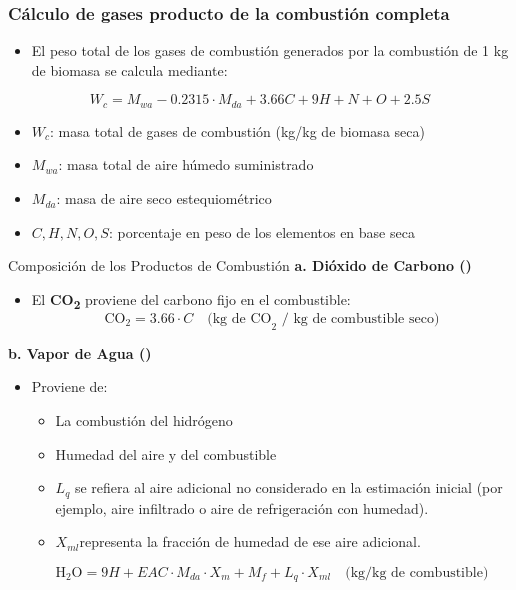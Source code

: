 \documentclass[../../main.tex]{subfiles}
\begin{document}
\begin{frame}
\frametitle{Cálculo de gases producto de la combustión completa}

\begin{itemize}
    \item El peso total de los gases de combustión generados por la combustión de 1 kg de biomasa se calcula mediante:
\end{itemize}

\[
W_c = M_{wa} - 0.2315 \cdot M_{da} + 3.66C + 9H + N + O + 2.5S \tag{3.33}
\]

\begin{itemize}
    \item $W_c$: masa total de gases de combustión (kg/kg de biomasa seca)
    \item $M_{wa}$: masa total de aire húmedo suministrado
    \item $M_{da}$: masa de aire seco estequiométrico
    \item $C, H, N, O, S$: porcentaje en peso de los elementos en base seca
\end{itemize}

\end{frame}



\begin{frame}{Composición de los Productos de Combustión}
\textbf{a. Dióxido de Carbono ()}

\begin{itemize}
    \item El \textbf{CO\textsubscript{2}} proviene del carbono fijo en el combustible:
    \[
    \text{CO}_2 = 3.66 \cdot C \quad \text{(kg de CO}_2\text{ / kg de combustible seco)}
    \]
\end{itemize}

\textbf{b. Vapor de Agua ()}

\begin{itemize}
    \item Proviene de:
    \begin{itemize}
        \item La combustión del hidrógeno
        \item Humedad del aire y del combustible
        \item \(L_q\) se refiera al aire adicional no considerado en la estimación inicial (por ejemplo, aire infiltrado o aire de refrigeración con humedad).
        \item \(X_{ml}\)representa la fracción de humedad de ese aire adicional.
    \end{itemize}
    \[
    \text{H}_2\text{O} = 9H + EAC \cdot M_{da} \cdot X_m + M_f + L_q \cdot X_{ml}
    \quad \text{(kg/kg de combustible)}
    \]
\end{itemize}

\end{frame}
\end{document}
